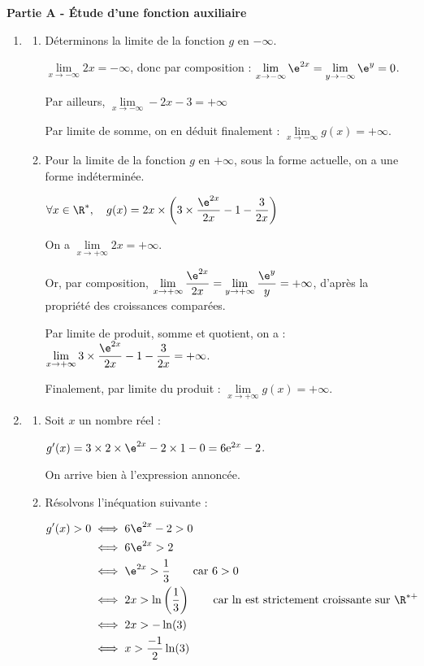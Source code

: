 \medskip

\textbf{Partie A - Étude d'une fonction auxiliaire}

\medskip

\begin{enumerate}
\item 
	\begin{enumerate}
		\item Déterminons la limite de la fonction $g$ en $-\infty$.

$\lim\limits_{x \to -\infty} 2x = -\infty$, donc par composition : $\lim\limits_{x \to -\infty} \e^{2x} = \lim\limits_{y \to -\infty} \e^{y} = 0$.

Par ailleurs, $\lim\limits_{x \to -\infty} -2x - 3 = +\infty$

Par limite de somme, on en déduit finalement : $\lim\limits_{x \to -\infty} g(x) = +\infty$.

		\item Pour la limite de la fonction $g$ en $+\infty$, sous la forme actuelle, on a une forme indéterminée.

$\forall x \in \R^*, \quad g(x) = 2x \times \left(3 \times \dfrac{\e^{2x}}{2x} - 1 - \dfrac{3}{2x}\right)$

On a $\lim\limits_{x \to +\infty} 2x = +\infty$.

Or, par composition, $\lim\limits_{x \to +\infty} \dfrac{\e^{2x}}{2x} = \lim\limits_{y \to +\infty} \dfrac{\e^y}{y} = +\infty$, d'après la propriété des croissances comparées.

Par limite de produit, somme et quotient, on a : $\lim\limits_{x \to +\infty} 3\times \dfrac{\e^{2x}}{2x} - 1 - \dfrac{3}{2x} = +\infty$.

Finalement, par limite du produit : $\lim\limits_{x \to +\infty}g(x) = +\infty$.
	\end{enumerate}
\item 
	\begin{enumerate}
		\item Soit $x$ un nombre réel :

$g'(x) = 3 \times 2 \times \e^{2x} - 2\times 1 - 0 = 6 \mathrm{e}^{2 x}-2$.

On arrive bien à l'expression annoncée.

		\item Résolvons l'inéquation suivante :

$\begin{aligned} g'(x) > 0 &\iff 6\e^{2x}-2 > 0\\
&\iff 6\e^{2x} > 2\\
&\iff \e^{2x} > \dfrac{1}{3} \qquad \text{car }6 > 0\\
&\iff 2x > \ln\left(\dfrac{1}{3}\right) \qquad \text{car ln est strictement croissante sur } \R^{*+}\\
&\iff 2x > -\ln(3)\\
&\iff x > \dfrac{-1}{2}\ln(3)
\\ \end{aligned}$


\end{enumerate}
\end{enumerate}
